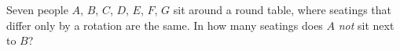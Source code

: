 Seven people $A$, $B$, $C$, $D$, $E$, $F$, $G$ sit around a round table, where seatings that differ only by a rotation are the same. In how many seatings does $A$ \emph{not} sit next to $B$?
